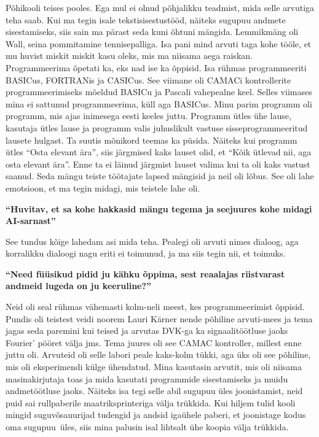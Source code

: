 Põhikooli teises pooles. Ega mul ei olnud põhjalikku teadmist, mida selle
arvutiga teha saab. Kui ma tegin isale tekstisisestustööd, näiteks sugupuu
andmete sisestamiseks, siis sain ma pärast seda kuni õhtuni mängida. Lemmikmäng
oli Wall, seina pommitamine tennisepalliga. Isa pani mind
arvuti taga kohe tööle, et mu huvist miskit miskit kasu oleks, mis ma niisama
aega raiskan. Programmeerima õpetati ka, eks nad ise ka õppisid. Isa rühmas
programmeeriti BASICus, FORTRANis ja
CASICus. See viimane oli CAMACi kontrollerite
programmeerimiseks mõeldud BASICu ja Pascali vahepealne
keel. Selles viimases
mina ei sattunud programmeerima, küll aga BASICus. Minu parim programm oli
programm, mis ajas inimesega eesti keeles juttu. Programm ütles ühe lause,
kasutaja ütles lause ja programm valis juhuslikult vastuse sisseprogrammeeritud
lausete hulgast. Ta suutis mõnikord teemas ka püsida. Näiteks kui programm
ütles \enquote{Osta elevant ära}, siis järgmised kaks lauset olid, et
\enquote{Kõik ütlevad nii, aga osta elevant ära}. Enne ta ei läinud järgmist
lauset valima kui ta oli kaks vastust saanud. Seda mängu teiste töötajate
lapsed mängisid ja neil oli lõbus. See oli lahe emotsioon, et ma tegin midagi,
mis teistele lahe oli.

\textbf{\enquote{Huvitav, et sa kohe hakkasid mängu tegema ja seejuures kohe
midagi AI-sarnast}}

See tundus kõige lahedam asi mida teha. Pealegi oli arvuti nimes dialoog, aga
korralikku dialoogi nagu eriti ei toimunud, ja ma siis tegin nii, et toimuks.

\textbf{\enquote{Need füüsikud pidid ju kähku õppima, sest reaalajas
riistvarast andmeid lugeda on ju keeruline?}}

Neid oli seal rühmas vähemasti kolm-neli meest, kes programmeerimist õppisid. Pundis
oli teistest veidi noorem Lauri Kärner nende põhiline arvuti-mees ja tema jagas
seda paremini kui teised ja arvutas DVK-ga ka signaalitöötluse jaoks Fourier'
pööret välja jms. Tema juures oli see CAMAC kontroller, millest enne juttu oli.
Arvuteid oli selle labori peale kaks-kolm tükki, aga üks oli see põhiline, mis
oli eksperimendi külge ühendatud. Mina kasutasin arvutit, mis oli niisama
masinakirjutaja toas ja mida kasutati programmide sisestamiseks ja muidu
andmetöötluse jaoks. Näiteks isa tegi selle abil sugupuu üles joonistamist,
neid puid sai rullpaberile maatriksprinteriga välja trükkida. Kui hiljem tulid kooli
mingid suguvõsauurijad tudengid ja andsid igaühele paberi, et joonistage kodus
oma sugupuu üles, siis mina palusin isal lihtsalt ühe koopia välja trükkida.

